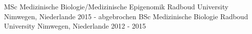 

\begin{cventries}

\cventry
  { MSc Medizinische Biologie/Medizinische Epigenomik } %
  { Radboud University } %
  { Nimwegen, Niederlande } %
  { 2015 - abgebrochen } %
  {}
\cventry
  { BSc Medizinische Biologie } %
  { Radboud University } %
  { Nimwegen, Niederlande } %
  { 2012 - 2015 } %
  {}

\end{cventries}